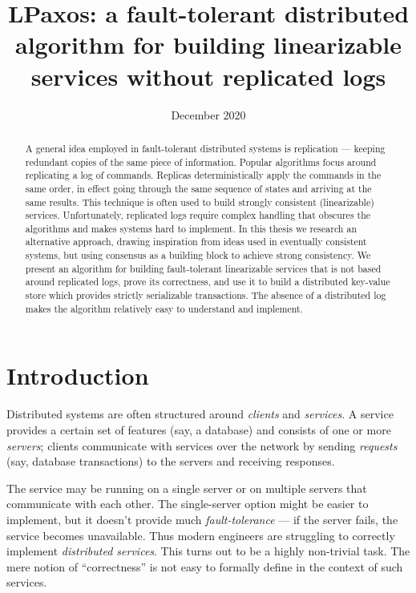 \documentclass[12pt,a4paper,en]{pracamgr}
\title{LPaxos: a fault-tolerant distributed algorithm for building linearizable services without replicated logs}
\date{December 2020}
\newcommand{\ti}[1]{\textit{#1}}
\begin{document}
\maketitle

\begin{abstract}
    A general idea employed in fault-tolerant distributed systems is replication --- keeping redundant copies of the same piece of information. Popular algorithms focus around replicating a log of commands. Replicas deterministically apply the commands in the same order, in effect going through the same sequence of states and arriving at the same results. This technique is often used to build strongly consistent (linearizable) services. Unfortunately, replicated logs require complex handling that obscures the algorithms and makes systems hard to implement. In this thesis we research an alternative approach, drawing inspiration from ideas used in eventually consistent systems, but using consensus as a building block to achieve strong consistency. We present an algorithm for building fault-tolerant linearizable services that is not based around replicated logs, prove its correctness, and use it to build a distributed key-value store which provides strictly serializable transactions. The absence of a distributed log makes the algorithm relatively easy to understand and implement.
\end{abstract}

\tableofcontents

\chapter{Introduction}

Distributed systems are often structured around \ti{clients} and \ti{services}. A service provides a certain set of features (say, a database) and consists of one or more \ti{servers}; clients communicate with services over the network by sending \ti{requests} (say, database transactions) to the servers and receiving responses.

The service may be running on a single server or on multiple servers that communicate with each other. The single-server option might be easier to implement, but it doesn't provide much \ti{fault-tolerance} --- if the server fails, the service becomes unavailable. Thus modern engineers are struggling to correctly implement \ti{distributed services}. This turns out to be a highly non-trivial task. The mere notion of ``correctness'' is not easy to formally define in the context of such services.
\end{document}
